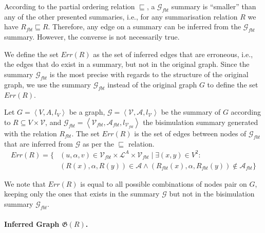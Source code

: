 According to the partial ordering relation $\sqsubseteq$, a $\mathcal{G}_{fbt}$ summary is ``smaller'' than any of the other presented summaries, i.e., for any summarisation relation $R$ we have $R_{fbt} \sqsubseteq R$. Therefore, any edge on a summary can be inferred from the $\mathcal{G}_{fbt}$ summary. However, the converse is not necessarily true.

We define the set $Err(R)$ as the set of inferred edges that are erroneous, i.e., the edges that do exist in a summary, but not in the original graph. Since the summary $\mathcal{G}_{fbt}$ is the most precise with regards to the structure of the original graph, we use the summary $\mathcal{G}_{fbt}$ instead of the original graph $G$ to define the set $Err(R)$.

\begin{definition}
Let $G=\left\langle V, A, l_V \right\rangle$ be a graph, $\mathcal{G} = \left\langle \mathcal{V}, \mathcal{A}, l_{\mathcal{V}} \right\rangle$ be the summary of $G$ according to $R \subseteq V \times \mathcal{V}$, and $\mathcal{G}_{fbt} = \left\langle \mathcal{V}_{fbt}, \mathcal{A}_{fbt}, l_{\mathcal{V}_{fbt}} \right\rangle$ the bisimulation summary generated with the relation $R_{fbt}$.
The set $Err(R)$ is the set of edges between nodes of $\mathcal{G}_{fbt}$ that are inferred from $\mathcal{G}$ as per the $\sqsubseteq$ relation.
\begin{equation*}
\begin{split}
Err(R) = \{ & (u, \alpha, v) \in \mathcal{V}_{fbt} \times \mathcal{L}^A \times \mathcal{V}_{fbt} \mid \exists (x, y) \in V^2 :\\
 & (R(x), \alpha, R(y)) \in \mathcal{A} \wedge (R_{fbt}(x), \alpha, R_{fbt}(y)) \not \in \mathcal{A}_{fbt} \}
\end{split}
\end{equation*}
\end{definition}

We note that $Err(R)$ is equal to all possible combinations of nodes pair on $G$, keeping only the ones that exists in the summary $\mathcal{G}$ but not in the bisimulation summary $\mathcal{G}_{fbt}$.

\paragraph{Inferred Graph $\mathfrak{G}(R)$.}

